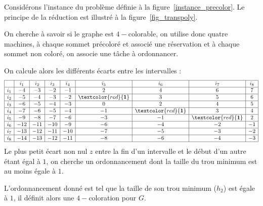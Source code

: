 \begin{ex}
    Considérons l'instance du problème \precolor{} définie à la figure~\ref{instance_precolor}.
    Le principe de la réduction est illustré à la figure~\ref{fig_transpoly}.

    On cherche à savoir si le graphe est $4-$colorable, on utilise donc quatre machines, à chaque
    sommet précoloré et associé une réservation et à chaque sommet non coloré, on associe une tâche
    à ordonnancer. 
    
    On calcule alors les différents écarts entre les intervalles : \[
        \begin{array}{|c|c|c|c|c|c|c|c|c|}
            \hline & i_1 & i_2 & i_3 & i_4 & i_5 & i_6 & i_7 & i_8 \\
            \hline i_1 & -4 & -3 & -2 & -1 & 2 & 4 & 6 & 7 \\
            \hline i_2 & -5 & -4 & -3 & -2 & \textcolor{red}{\textbf{1}} & 3 & 5 & 6 \\
            \hline i_3 & -6 & -5 & -4 & -3 & 0 & 2 & 4 & 5 \\
            \hline i_4 & -7 & -6 & -5 & -4 & -1 & \textcolor{red}{\textbf{1}} & 3 & 4 \\
            \hline i_5 & -9 & -8 & -7 & -6 & -3 & -1 & \textcolor{red}{\textbf{1}} & 2 \\
            \hline i_6 & -12 & -11 & -10 & -9 & -6 & -4 & -2 & -1 \\
            \hline i_7 & -13 & -12 & -11 & -10 & -7 & -5 & -3 & -2 \\
            \hline i_8 & -14 & -13 & -12 & -11 & -8 & -6 & -4 & -3 \\
            \hline
        \end{array}
    \]
    Le plus petit écart non nul $z$ entre la fin d'un intervalle et le début d'un
    autre étant égal à $1$, on cherche un ordonnancement dont la taille du trou minimum est au moins
    égale à $1$.

    L'ordonnancement donné est tel que la taille de son trou minimum ($h_2$) est égale à $1$, il
    définit alors une $4-$coloration pour $G$.
    
\begin{figure}
    \begin{center}
\end{center}
\end{figure}
\end{ex}
